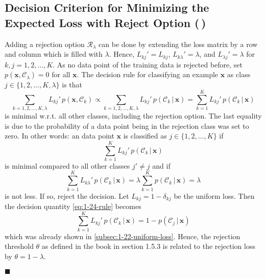 \documentclass[11pt, a4paper]{scrartcl}
\renewcommand{\vec}[1]{\bm{#1}}
\newcommand{\given}{\,\vert\,}
\newcommand{\eot}{\hfill\(\blacksquare\)}
\newcommand{\diffstar}{\texorpdfstring{\raisebox{-1pt}{\resizebox{!}{8pt}{\(\star\)}}}{*}}
\newcommand{\twostar}  {(\diffstar\,\diffstar)}
\begin{document}
		\subsection{Decision Criterion for Minimizing the Expected Loss with Reject Option  \twostar}
			Adding a rejection option \( \mathcal{R}_\lambda \) can be done by extending the loss matrix by a row and column which is filled with \(\lambda\). Hence, \( L_{kj}' = L_{kj} \), \( L_{k\lambda}' = \lambda \), and \( L_{\lambda j}' = \lambda \) for \( k, j = 1, 2, \dots, K \). As no data point of the training data is rejected before, set \( p(\vec{x}, \mathcal{C}_\lambda) = 0 \) for all \(\vec{x}\). The decision rule for classifying an example \(\vec{x}\) as class \( j \in \{ 1, 2, \dots, K, \lambda \} \) is that
			\begin{equation}
				\sum_{k = 1, 2, \dots, K, \lambda} L_{kj}' \, p(\vec{x}, \mathcal{C}_k)
					\propto \sum_{k = 1, 2, \dots, K, \lambda} L_{kj}' \, p(\mathcal{C}_k \given \vec{x})
					= \sum_{k = 1}^{K} L_{kj}' \, p(\mathcal{C}_k \given \vec{x})
			\end{equation}
			is minimal w.r.t. all other classes, including the rejection option. The last equality is due to the probability of a data point being in the rejection class was set to zero. In other words: an data point \(\vec{x}\) is classified as \( j \in \{ 1, 2, \dots, K \} \) if
			\begin{equation}
				\sum_{k = 1}^{K} L_{kj}' \, p(\mathcal{C}_k \given \vec{x})  \label{eq:1-24-rule}
			\end{equation}
			is minimal compared to all other classes \( j' \neq j \) and if
			\begin{equation}
					  \sum_{k = 1}^{K} L_{k\lambda}' \, p(\mathcal{C}_k \given \vec{x})
					= \lambda \sum_{k = 1}^{K} p(\mathcal{C}_k \given \vec{x})
					= \lambda
			\end{equation}
			is not less. If so, reject the decision. Let \( L_{kj} = 1 - \delta_{kj} \) be the uniform loss. Then the decision quantity \eqref{eq:1-24-rule} becomes
			\begin{equation}
				\sum_{k = 1}^{K} L_{kj}' \, p(\mathcal{C}_k \given \vec{x})
					= 1 - p(\mathcal{C}_j \given \vec{x})
			\end{equation}
			which was already shown in \autoref{subsec:1-22-uniform-loss}. Hence, the rejection threshold \( \theta \) as defined in the book in section 1.5.3 is related to the rejection loss by \( \theta = 1 - \lambda \).

			\eot
\end{document}
